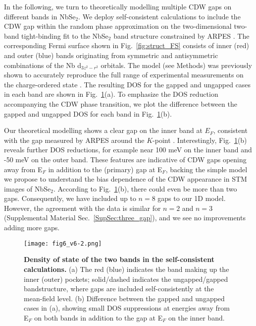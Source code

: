 \documentclass[aps,prl,twocolumn,superscriptaddress]{revtex4-2}
\def \suppsec[#1]{Supplemental Material Sec.~\ref{#1}}
\begin{document}
In the following, we turn to theoretically modelling 
multiple CDW gaps on different bands in NbSe$_2$. 
 We deploy self-consistent calculations to include the CDW gap within the random phase approximation on the two-dimensional two-band tight-binding fit to the NbSe$_2$ band structure constrained by ARPES \cite{Rahn2012}. The corresponding Fermi surface shown in Fig.~\ref{fig:struct_FS} consists of inner (red) and outer (blue) bands originating from symmetric and antisymmetric combinations of the Nb d$_{3z^2-r^2}$ orbitals. The model (see Methods) was previously shown to accurately reproduce the full range of experimental measurements on the charge-ordered state \cite{Flicker2015natcomm,Flicker2016prb}. The resulting DOS for the gapped and ungapped cases in each band are shown in Fig.~\ref{fig:self_consistent}(a). To emphasize the DOS reduction accompanying the CDW phase transition, we plot the difference between the gapped and ungapped DOS for each band in Fig.~\ref{fig:self_consistent}(b). 

Our theoretical modelling shows a clear gap on the inner band at $E_F$, consistent with the gap measured by ARPES around the $K$-point \cite{Rahn2012}. Interestingly, Fig.~\ref{fig:self_consistent}(b) reveals further DOS reductions, for example near 100 meV on the inner band and -50 meV on the outer band. These features are indicative of CDW gaps opening away from E$_F$ in addition to the (primary) gap at E$_F$, backing the simple model we propose to understand the bias dependence of the CDW appearance in STM images of NbSe$_2$. According to Fig.~\ref{fig:self_consistent}(b), there could even be more than two gaps. Consequently, we have included up to $n=8$ gaps to our 1D model. However, the agreement with the data is similar for $n=2$ and $n=3$ (\suppsec[SupSec:three_gap]), and we see no improvements adding more gaps. 

\begin{figure}[htp]
\texttt{[image: fig6\_v6-2.png]}%
\caption{\label{fig:self_consistent} \textbf{Density of state of the two bands in the self-consistent calculations. } (a) The red (blue) indicates the band making up the inner (outer) pockets; solid/dashed indicates the ungapped/gapped bandstructure, where gaps are included self-consistently at the mean-field level. (b) Difference between the gapped and ungapped cases in (a), showing small DOS suppressions at energies away from E$_F$ on both bands in addition to the gap at E$_F$ on the inner band.}
\end{figure}
\end{document}
